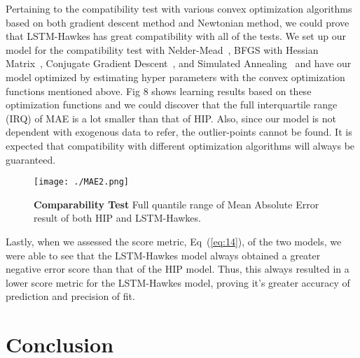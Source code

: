 \documentclass[10pt,letterpaper]{article}
\begin{document}
Pertaining to the compatibility test with various convex optimization algorithms based on both gradient descent method and Newtonian method, we could prove that LSTM-Hawkes has great compatibility with all of the tests. We set up our model for the compatibility test with Nelder-Mead~\cite{bib23}, BFGS with Hessian Matrix~\cite{bib24}, Conjugate Gradient Descent~\cite{bib25}, and Simulated Annealing~\cite{bib26} and have our model optimized by estimating hyper parameters with the convex optimization functions mentioned above. Fig 8 shows learning results based on these optimization functions and we could discover that the full interquartile range (IRQ) of MAE is a lot smaller than that of HIP.  Also, since our model is not dependent with exogenous data to refer, the outlier-points cannot be found. It is expected that compatibility  with different optimization algorithms will always be guaranteed.
%
\begin{figure}[H]
\centering
 \texttt{[image: ./MAE2.png]}
 \caption{{\bf Comparability Test} Full quantile range of Mean Absolute Error result of both HIP and LSTM-Hawkes.}
 \label{fig8}
\end{figure}

Lastly, when we assessed the score metric, Eq~(\ref{eq:14}), of the two models, we were able to see that the LSTM-Hawkes model always obtained a greater negative error score than that of the HIP model. Thus, this always resulted in a lower score metric for the LSTM-Hawkes model, proving it's greater accuracy of prediction and precision of fit.  
\section*{Conclusion}
\end{document}
